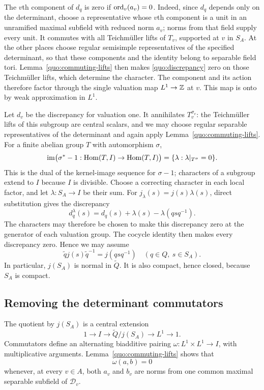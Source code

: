 The $v$th component of $d_q$ is zero if $\operatorname{ord}_v(a_v)=0$.
Indeed, since $d_q$ depends only on the determinant, choose a
representative whose $v$th component is a unit in an unramified maximal subfield with reduced norm $a_v$; norms from that
field supply every unit.  It commutes with all Teichm\"uller lifts
of $T_v$, supported at $v$ in $S_A$.  At the other places choose
regular semisimple representatives of the specified determinant, so
that these components and the identity belong to separable field
tori.  Lemma~\ref{quo:commuting-lifts} then makes
\eqref{quo:discrepancy} zero on those Teichm\"uller lifts, which
determine the character.  The component and its action therefore
factor through the single valuation map $L^1\to\mathbb Z$ at $v$.
This map is onto by weak approximation in $L^1$.

Let $d_v$ be the discrepancy for valuation one.  It annihilates
$T_v^{\sigma_v}$: the Teichm\"uller lifts of this subgroup are
central scalars, and we may choose regular separable representatives
of the determinant and again apply Lemma~\ref{quo:commuting-lifts}.
For a finite abelian group $T$ with automorphism $\sigma$,
\[
 \operatorname{im}\bigl(\sigma^*-1:\operatorname{Hom}(T,I)\to\operatorname{Hom}(T,I)\bigr)
   =\{\lambda:\lambda|_{T^\sigma}=0\}.
\]
This is the dual of the kernel-image sequence for $\sigma-1$;
characters of a subgroup extend to $I$ because $I$ is divisible.
Choose a correcting character in each local factor, and let
$\lambda:S_A\to I$ be their sum.  For
$j_\lambda(s)=j(s)\lambda(s)$, direct substitution gives the discrepancy
\[
 d_q^\lambda(s)=d_q(s)+\lambda(s)-\lambda(qsq^{-1}).
\]
The characters may therefore be chosen to make this discrepancy zero
at the generator of each valuation group.  The cocycle identity then
makes every discrepancy zero.  Hence we may assume
\begin{equation}\label{quo:equivariant-section}
 \widetilde q j(s)\widetilde q^{-1}=j(qsq^{-1})
 \quad(q\in Q,\ s\in S_A).
\end{equation}
In particular, $j(S_A)$ is normal in $\widetilde Q$.  It is also
compact, hence closed, because $S_A$ is compact.

\subsection{Removing the determinant commutators}

The quotient by $j(S_A)$ is a central extension
\begin{equation}\label{quo:abelian-base-extension}
 1\longrightarrow I\longrightarrow\widetilde Q/j(S_A)
        \longrightarrow L^1\longrightarrow1.
\end{equation}
Commutators define an alternating biadditive pairing
$\omega:L^1\times L^1\to I$, with multiplicative arguments.
Lemma~\ref{quo:commuting-lifts} shows that
\begin{equation}\label{quo:common-norm-test}
 \omega(a,b)=0
\end{equation}
whenever, at every $v\in A$, both $a_v$ and $b_v$ are norms from one
common maximal separable subfield of $\mathcal D_v$.

